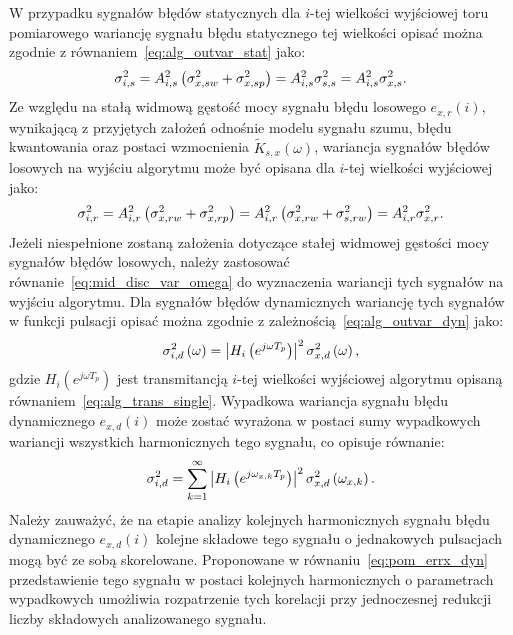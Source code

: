 W przypadku sygnałów błędów statycznych dla $i$-tej wielkości wyjściowej toru pomiarowego wariancję sygnału błędu statycznego tej wielkości opisać można zgodnie z równaniem~\eqref{eq:alg_outvar_stat} jako:
\begin{equation}
\sigma_{i,s}^{2} = A_{i,s}^{2} \left(\sigma_{x,sw}^{2} + \sigma_{x,sp}^{2}\right) = A_{i,s}^{2} \sigma_{s,s}^{2} = A_{i,s}^{2} \sigma_{x,s}^{2} \label{eq:pom_varout_stat}.
\end{equation}
Ze względu na stałą widmową gęstość mocy sygnału błędu losowego $e_{x,r}(i)$, wynikającą z przyjętych założeń odnośnie modelu sygnału szumu, błędu kwantowania oraz postaci wzmocnienia $\tilde{K}_{s,x}(\omega)$, wariancja sygnałów błędów losowych na wyjściu algorytmu może być opisana dla $i$-tej wielkości wyjściowej jako:
\begin{equation}
\sigma_{i,r}^{2} = A_{i,r}^{2} \left(\sigma_{x,rw}^{2} + \sigma_{x,rp}^{2}\right) = A_{i,r}^{2} \left(\sigma_{x,rw}^{2} + \sigma_{s,rw}^{2}\right) = A_{i,r}^{2} \sigma_{x,r}^{2} \label{eq:pom_varout_rand}.
\end{equation}
Jeżeli niespełnione zostaną założenia dotyczące stałej widmowej gęstości mocy sygnałów błędów losowych, należy zastosować równanie~\eqref{eq:mid_disc_var_omega} do wyznaczenia wariancji tych sygnałów na wyjściu algorytmu.
Dla sygnałów błędów dynamicznych wariancję tych sygnałów w funkcji pulsacji opisać można zgodnie z zależnością~\eqref{eq:alg_outvar_dyn} jako:
\begin{equation}
\sigma_{i,d}^{2} \left(\omega\right) = \left| H_{i} \left(e^{j \omega T_{p}}\right) \right|^{2} \sigma_{x,d}^{2} \left(\omega\right) \label{eq:pom_varout_dyn},
\end{equation}
gdzie $H_{i}(e^{j \omega T_{p}})$ jest transmitancją $i$-tej wielkości wyjściowej algorytmu opisaną równaniem~\eqref{eq:alg_trans_single}. Wypadkowa wariancja sygnału błędu dynamicznego $e_{x,d}(i)$ może zostać wyrażona w postaci sumy wypadkowych wariancji wszystkich harmonicznych tego sygnału, co opisuje równanie:
\begin{equation}
\sigma_{i,d}^{2} = \sum _{k=1} ^{\infty} \left| H_{i} \left(e^{j \omega_{x,k} T_{p}}\right) \right|^{2} \sigma_{x,d}^{2} \left(\omega_{x,k}\right) \label{eq:pom_varout_dyn_sum}.
\end{equation}
Należy zauważyć, że na etapie analizy kolejnych harmonicznych sygnału błędu dynamicznego $e_{x,d}(i)$ kolejne składowe tego sygnału o jednakowych pulsacjach mogą być ze sobą skorelowane. Proponowane w równaniu~\eqref{eq:pom_errx_dyn} przedstawienie tego sygnału w postaci kolejnych harmonicznych o parametrach wypadkowych umożliwia rozpatrzenie tych korelacji przy jednoczesnej redukcji liczby składowych analizowanego sygnału.

